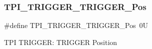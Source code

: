 \subsubsection{\texorpdfstring{T\+P\+I\+\_\+\+T\+R\+I\+G\+G\+E\+R\+\_\+\+T\+R\+I\+G\+G\+E\+R\+\_\+\+Pos}{TPI\_TRIGGER\_TRIGGER\_Pos}\hspace{0.1cm}{\footnotesize\ttfamily [4/4]}}
{\footnotesize\ttfamily \#define T\+P\+I\+\_\+\+T\+R\+I\+G\+G\+E\+R\+\_\+\+T\+R\+I\+G\+G\+E\+R\+\_\+\+Pos~0U}

T\+PI T\+R\+I\+G\+G\+ER\+: T\+R\+I\+G\+G\+ER Position 